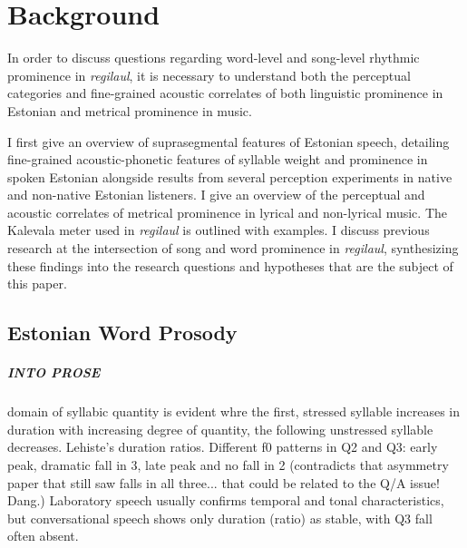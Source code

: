 \chapter{Background}
In order to discuss questions regarding word-level and song-level rhythmic prominence in {\it regilaul},  it is necessary to understand both the perceptual categories and fine-grained acoustic correlates of both linguistic prominence in Estonian and metrical prominence in music. 

 I first give an overview of suprasegmental features of Estonian speech, detailing fine-grained acoustic-phonetic features of syllable weight and prominence in spoken Estonian alongside results from several perception experiments in native and non-native Estonian listeners. I give an overview of the perceptual and acoustic correlates of metrical prominence in lyrical and non-lyrical music. The Kalevala meter used in {\it regilaul} is outlined with examples. I discuss previous research at the intersection of song and word prominence in {\it regilaul}, synthesizing these findings into the research questions and hypotheses that are the subject of this paper. 







%

\section{Estonian Word Prosody}




\paragraph{INTO PROSE}
domain of syllabic quantity is evident whre the first, stressed syllable increases in duration with increasing degree of quantity, the following unstressed syllable decreases. 
Lehiste's duration ratios. 
Different f0 patterns in Q2 and Q3: early peak, dramatic fall in 3, late peak and no fall in 2 (contradicts that asymmetry paper that still saw falls in all three... that could be related to the Q/A issue! Dang.)
Laboratory speech usually confirms temporal and tonal characteristics, but conversational speech shows only duration (ratio) as stable, with Q3 fall often absent. 

